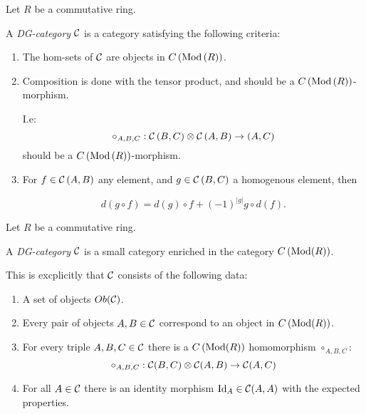 \begin{definition}
    \label{def:massey_product_in_dg_cat/what_is_a_dg_cat/dg_cat_keller_1994}
    Let \( R \) be a commutative ring.

    A \emph{DG-category} \( {\mathcal{C}} \) is a category satisfying the following criteria:
    \begin{enumerate}
        \item The hom-sets of \( {\mathcal{C}} \) are objects in \( C \left( \operatorname{Mod} \left( R \right)  \right) \).
        \item{
            Composition is done with the tensor product, and should be a \( C \left( \operatorname{Mod} \left( R \right)  \right) \)-morphism.

            I.e:
            \[
                \circ_{A, B, C}: {\mathcal{C}} \left( B, C \right) \otimes {\mathcal{C}} \left( A, B \right) \to \left( A, C \right)
            \]
            should be a \( C \left( \operatorname{Mod} \left( R \right)  \right) \)-morphism.
        }
        \item {
            For \( f \in {\mathcal{C}} \left( A, B \right) \) any element, and \( g \in {\mathcal{C}} \left( B, C \right) \) a homogenous element, then

            \[
                d(g \circ f) = d(g) \circ f + (-1)^{|g|} g \circ d(f).
            \]
        }
    \end{enumerate}
\end{definition}

\begin{definition}
    \label{def:massey_product_in_dg_cat/what_is_a_dg_cat/dg_cat_berest--mehrle_2017}
    Let \( R \) be a commutative ring.

    A \emph{DG-category} \( {\mathcal{C}} \) is a small category enriched in the category \( C \left( \operatorname{Mod}(R) \right) \).

    This is excplicitly that \( {\mathcal{C}} \) consists of the following data:
    \begin{enumerate}
        \item A set of objects \( Ob({\mathcal{C}}) \).
        \item Every pair of objects \( A, B \in {\mathcal{C}} \) correspond to an object in \( C \left( \operatorname{Mod}(R) \right) \).
        \item{
            For every triple \( A, B, C \in {\mathcal{C}} \) there is a \( C \left( \operatorname{Mod}(R) \right) \) homomorphism \( \circ_{A,B,C} \):
            \[
                \circ_{A, B, C}: {\mathcal{C}}(B, C) \otimes {\mathcal{C}}(A, B) \to {\mathcal{C}}(A, C)
            \]
        }
        \item For all \( A \in {\mathcal{C}} \) there is an identity morphism \( \operatorname{Id}_A \in {\mathcal{C}}(A, A) \) with the expected properties.
    \end{enumerate}
\end{definition}

